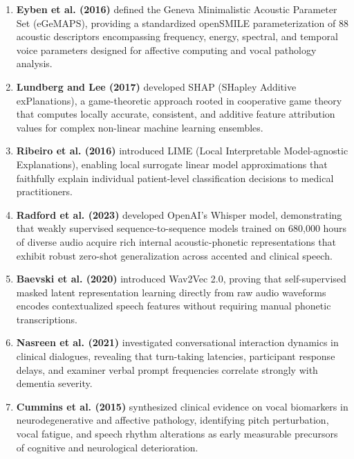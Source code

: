 \documentclass[conference]{IEEEtran}
\begin{document}
\begin{enumerate}
    \item \textbf{Eyben et al. (2016)} \cite{eyben2016geneva} defined the Geneva Minimalistic Acoustic Parameter Set (eGeMAPS), providing a standardized openSMILE parameterization of 88 acoustic descriptors encompassing frequency, energy, spectral, and temporal voice parameters designed for affective computing and vocal pathology analysis.
    
    \item \textbf{Lundberg and Lee (2017)} \cite{lundberg2017unified} developed SHAP (SHapley Additive exPlanations), a game-theoretic approach rooted in cooperative game theory that computes locally accurate, consistent, and additive feature attribution values for complex non-linear machine learning ensembles.
    
    \item \textbf{Ribeiro et al. (2016)} \cite{ribeiro2016should} introduced LIME (Local Interpretable Model-agnostic Explanations), enabling local surrogate linear model approximations that faithfully explain individual patient-level classification decisions to medical practitioners.
    
    \item \textbf{Radford et al. (2023)} \cite{radford2023robust} developed OpenAI's Whisper model, demonstrating that weakly supervised sequence-to-sequence models trained on 680,000 hours of diverse audio acquire rich internal acoustic-phonetic representations that exhibit robust zero-shot generalization across accented and clinical speech.
    
    \item \textbf{Baevski et al. (2020)} \cite{baevski2020wav2vec} introduced Wav2Vec 2.0, proving that self-supervised masked latent representation learning directly from raw audio waveforms encodes contextualized speech features without requiring manual phonetic transcriptions.
    
    \item \textbf{Nasreen et al. (2021)} \cite{nasreen2021exploring} investigated conversational interaction dynamics in clinical dialogues, revealing that turn-taking latencies, participant response delays, and examiner verbal prompt frequencies correlate strongly with dementia severity.
    
    \item \textbf{Cummins et al. (2015)} \cite{cummins2018review} synthesized clinical evidence on vocal biomarkers in neurodegenerative and affective pathology, identifying pitch perturbation, vocal fatigue, and speech rhythm alterations as early measurable precursors of cognitive and neurological deterioration.
    

\end{enumerate}
\end{document}
